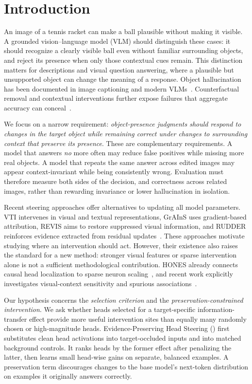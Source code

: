 \section{Introduction}
\label{sec:intro}

An image of a tennis racket can make a ball plausible without making it
visible. A grounded vision--language model (VLM) should distinguish these
cases: it should recognize a clearly visible ball even without familiar
surrounding objects, and reject its presence when only those contextual cues
remain. This distinction matters for descriptions and visual question
answering, where a plausible but unsupported object can change the meaning
of a response. Object hallucination has been documented in image captioning
and modern VLMs~\cite{chair,pope}. Counterfactual removal and contextual
interventions further expose failures that aggregate accuracy can
conceal~\cite{removedobjects,causalhalbench}.

We focus on a narrow requirement: \emph{object-presence judgments should
respond to changes in the target object while remaining correct under
changes to surrounding context that preserve its presence}. These are
complementary requirements. A model that answers \emph{no} more often may
reduce false positives while missing more real objects. A model that repeats
the same answer across edited images may appear context-invariant while
being consistently wrong. Evaluation must therefore measure both sides of
the decision, and correctness across related images, rather than rewarding
invariance or lower hallucination in isolation.

Recent steering approaches offer alternatives to updating all model
parameters. VTI intervenes in visual and textual representations, GrAInS uses
gradient-based attribution, REVIS aims to restore suppressed visual
information, and RUDDER reinforces evidence extracted from residual
updates~\cite{vti,grains,revis,rudder}. These approaches motivate studying
where an intervention should act. However, their existence also raises the
standard for a new method: stronger visual features or sparse intervention
alone is not a sufficient methodological contribution.
HONES already connects causal head localization to sparse neuron
scaling~\cite{hones}, and recent work explicitly investigates visual-context
sensitivity and spurious associations~\cite{seeingknowing,purge}.

Our hypothesis concerns the \emph{selection criterion} and the
\emph{preservation-constrained intervention}. We ask whether heads selected
for a target-specific information-transfer effect provide more useful
intervention sites than equally many randomly chosen or high-magnitude
heads. Evidence-Preserving Head Steering (\method) first substitutes clean
head activations into target-occluded inputs and into matched background
controls. It ranks heads by the former effect after penalizing the latter,
then learns small head-wise gains on separate, balanced examples. A
preservation term discourages changes to the base model's next-token
distribution on examples it originally answers correctly.

